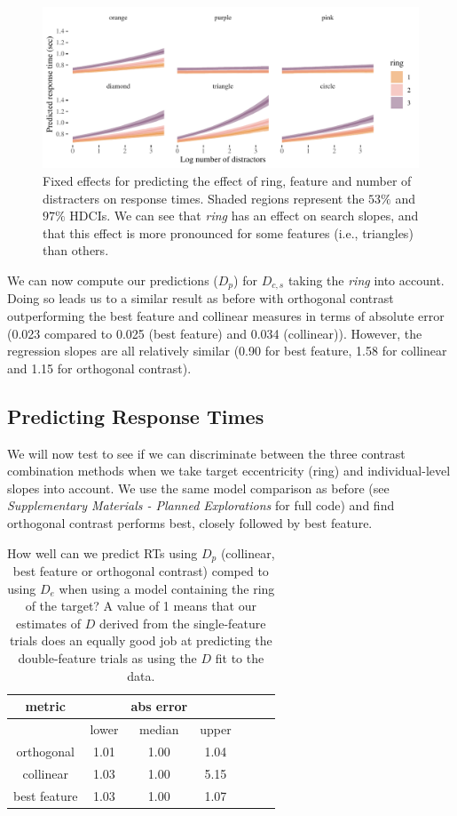 \documentclass[preprint,12pt,authoryear]{elsarticle}
\begin{document}
\begin{figure}[ht]
\centering
\includegraphics[width=\textwidth]{../plots/ring_single_feature.pdf}
\caption{Fixed effects for predicting the effect of ring, feature and number of distracters on response times.  Shaded regions represent the $53\%$ and $97\%$ HDCIs. We can see that \textit{ring} has an effect on search slopes, and that this effect is more pronounced for some features (i.e., triangles) than others.}
\label{fig:ring1}
\end{figure}

We can now compute our predictions ($D_p$) for $D_{c,s}$ taking the \textit{ring} into account. Doing so leads us to a similar result as before with orthogonal contrast outperforming the best feature and collinear measures in terms of absolute error (0.023 compared to 0.025 (best feature) and 0.034 (collinear)). However, the regression slopes are all relatively similar (0.90 for best feature, 1.58 for collinear and 1.15 for orthogonal contrast).

\subsection{Predicting Response Times}

We will now test to see if we can discriminate between the three contrast combination methods when we take target eccentricity (ring) and individual-level slopes into account. We use the same model comparison as before (see \textit{Supplementary Materials - Planned Explorations } for full code) and find orthogonal contrast performs best, closely followed by best feature. 

\begin{table}[h]
\centering
\begin{tabular}{c|ccc|ccc} 
\hline
metric & & abs error & &   \\
 \hline
  & lower  & median & upper \\
 
orthogonal & 1.01 & 1.00 & 1.04 \\
collinear & 1.03 & 1.00 & 5.15\\ 
best feature  & 1.03 & 1.00 & 1.07 \\
 \end{tabular}
\caption{How well can we predict RTs using $D_p$ (collinear, best feature or orthogonal contrast) comped to using $D_e$ when using a model containing the ring of the target? A value of 1 means that our estimates of $D$ derived from the single-feature trials does an equally good job at predicting the double-feature trials as using the $D$ fit to the data.}
\label{tab:new_pred_rt_ring}
\end{table}
\end{document}
